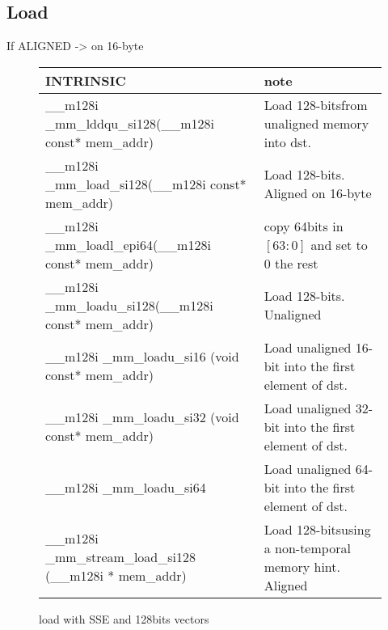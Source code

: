 \documentclass{article}
\begin{document}
\subsection{Load}
If ALIGNED -> on 16-byte
\vspace{1cm}
\begin{figure}[h!]
\noindent
\noindent\begin{tabular}{|l|l|}
  \hline
  INTRINSIC & note \\
  \hline
  \_\_m128i \_mm\_lddqu\_si128(\_\_m128i const* mem\_addr) & Load 128-bitsfrom unaligned memory into dst. \\
    \hline
  \_\_m128i \_mm\_load\_si128(\_\_m128i const* mem\_addr)& Load 128-bits. Aligned on 16-byte \\  
  \hline
  \_\_m128i \_mm\_loadl\_epi64(\_\_m128i const* mem\_addr) & copy 64bits in $[63:0]$ and set to 0 the rest \\
  \hline
  \_\_m128i \_mm\_loadu\_si128(\_\_m128i const* mem\_addr)&Load 128-bits. Unaligned  \\  
  \hline
  \_\_m128i \_mm\_loadu\_si16 (void const* mem\_addr)& Load unaligned 16-bit into the first element of dst.\\  
  \hline
  \_\_m128i \_mm\_loadu\_si32 (void const* mem\_addr)&Load unaligned 32-bit into the first element of dst. \\  
  \hline
  \_\_m128i \_mm\_loadu\_si64 & Load unaligned 64-bit into the first element of dst.\\  
  \hline
  \_\_m128i \_mm\_stream\_load\_si128 (\_\_m128i * mem\_addr)& Load 128-bitsusing a non-temporal memory hint. Aligned \\  
  \hline
  
\end{tabular}
    \caption{load with SSE and 128bits vectors}
    \label{fig:set of load 128 instructions}
\end{figure}
\end{document}
